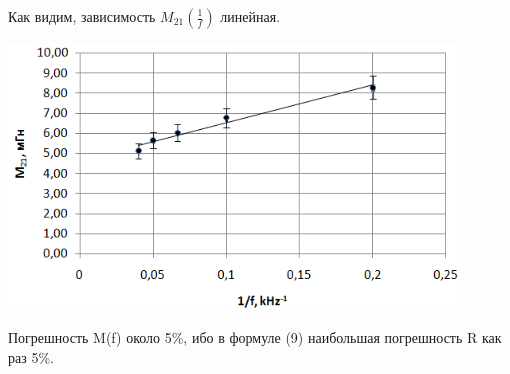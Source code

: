 \documentclass[12pt]{article}
\begin{document}
    Как видим, зависимость $M_{21}(\frac{1}{f})$ линейная.
    
    \begin{center}
    	\includegraphics[width=12cm]{graph2.png}
    \end{center}
    
    Погрешность M(f) около 5\%, ибо в формуле (9) наибольшая погрешность R как раз 5\%.
    
\end{document}
